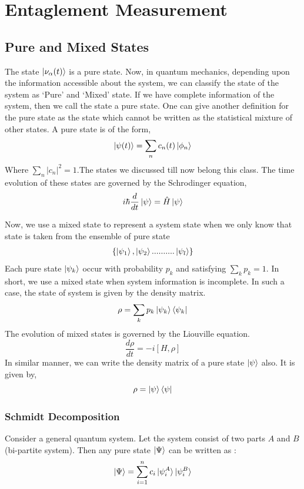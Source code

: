 \documentclass[12pt,a4paper]{report}
\begin{document}
\section{Entaglement Measurement}
\subsection{Pure and Mixed States}
The state $\ket{\nu_{\alpha}(t)}$ is a pure state. Now, in quantum mechanics, depending upon the information accessible about the system, we can classify the state of the system as ‘Pure’ and ‘Mixed’ state. If we have complete information of the system, then we call the state a pure state. One can give another definition for the pure state as the state which cannot be written as the statistical mixture of other states. A pure state is of the form,
\begin{equation}
\ket{\psi(t)}=\sum_{n}c_{n}(t)\ket{\phi_{n}}
\end{equation}
Where $\sum_{n}|c_{n}|^{2}=1$.The states we discussed till now belong this class. The time evolution of these states are governed by the Schrodinger equation,
\begin{equation}
    i\hbar\frac{d}{dt}\ket{\psi} = \hat{H}\ket{\psi}
\end{equation}\par
Now, we use a mixed state to represent a system state when we only know that state is taken from the ensemble of pure state
\begin{gather}
\{\ket{\psi_{1}},\ket{\psi_{2}}..........\ket{\psi_{l}}\}
\end{gather}
Each pure state $\ket{\psi_{k}}$ occur with probability $p_{k}$ and  satisfying $\sum_{k}p_{k}=1$. In short, we use a mixed state when system information is incomplete. In such a case, the state of system is given by the density matrix.
\begin{equation}
\rho = \sum_{k}p_{k}\ket{\psi_{k}}\bra{\psi_{k}}
\end{equation}
The evolution of mixed states is governed by the Liouville equation.
\begin{equation}
\frac{d\rho}{dt} = -i\left[H,\rho\right]
\end{equation}
In similar manner, we can write the density matrix of a pure state $\ket{\psi}$ also. It is given by,
\begin{equation}
\rho = \ket{\psi}\bra{\psi}
\end{equation}
\subsubsection{Schmidt Decomposition}
Consider a general quantum system. Let the system consist of two parts $A$ and $B$ (bi-partite system). Then any pure state $\ket{\Psi}$ can be written as :
\begin{equation}
\label{eq-sup}
\ket{\Psi} = \sum_{i=1}^{n} c_{i}\ket{\psi_{i}^{A}}\ket{\psi_{i}^{B}}
\end{equation} 
\end{document}
